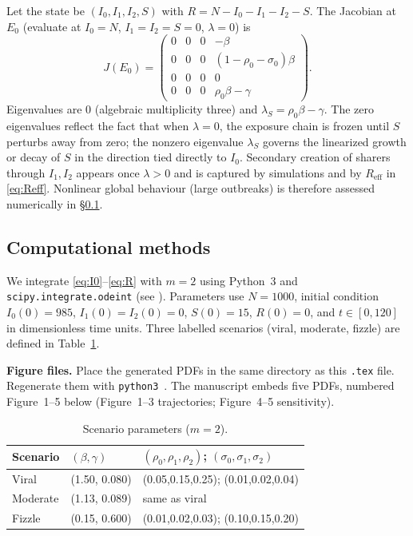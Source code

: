 \documentclass[11pt]{article}
\begin{document}
Let the state be $(I_0,I_1,I_2,S)$ with $R=N-I_0-I_1-I_2-S$. The Jacobian at $E_0$ (evaluate at $I_0=N$, $I_1=I_2=S=0$, $\lambda=0$) is
\begin{equation}
J(E_0)=
\begin{pmatrix}
0 & 0 & 0 & -\beta \\
0 & 0 & 0 & (1-\rho_0-\sigma_0)\beta \\
0 & 0 & 0 & 0 \\
0 & 0 & 0 & \rho_0\beta-\gamma
\end{pmatrix}.
\label{eq:Jac}
\end{equation}
Eigenvalues are $0$ (algebraic multiplicity three) and $\lambda_S=\rho_0\beta-\gamma$. The zero eigenvalues reflect the fact that when $\lambda=0$, the exposure chain is frozen until $S$ perturbs away from zero; the nonzero eigenvalue $\lambda_S$ governs the linearized growth or decay of $S$ in the direction tied directly to $I_0$. Secondary creation of sharers through $I_1,I_2$ appears once $\lambda>0$ and is captured by simulations and by $R_{\mathrm{eff}}$ in \eqref{eq:Reff}. Nonlinear global behaviour (large outbreaks) is therefore assessed numerically in \S\ref{sec:comp}.

\subsection{Computational methods}
\label{sec:comp}

We integrate \eqref{eq:I0}--\eqref{eq:R} with $m=2$ using Python~3 and \texttt{scipy.integrate.odeint} (see ). Parameters use $N=1000$, initial condition $I_0(0)=985$, $I_1(0)=I_2(0)=0$, $S(0)=15$, $R(0)=0$, and $t\in[0,120]$ in dimensionless time units. Three labelled scenarios (viral, moderate, fizzle) are defined in Table~\ref{tab:param}.

\textbf{Figure files.} Place the generated PDFs in the same directory as this \texttt{.tex} file. Regenerate them with \texttt{python3}~. The manuscript embeds five PDFs, numbered Figure~1--5 below (Figure~1--3 trajectories; Figure~4--5 sensitivity).

\begin{table}[htbp]
\centering
\caption{Scenario parameters ($m=2$).}
\label{tab:param}
\begin{tabular}{|l|l|l|}
\hline
\textbf{Scenario} & $(\beta,\gamma)$ & $(\rho_0,\rho_1,\rho_2)$; $(\sigma_0,\sigma_1,\sigma_2)$ \\
\hline
Viral & (1.50, 0.080) & (0.05,0.15,0.25); (0.01,0.02,0.04) \\
Moderate & (1.13, 0.089) & same as viral \\
Fizzle & (0.15, 0.600) & (0.01,0.02,0.03); (0.10,0.15,0.20) \\
\hline
\end{tabular}
\end{table}
\end{document}
